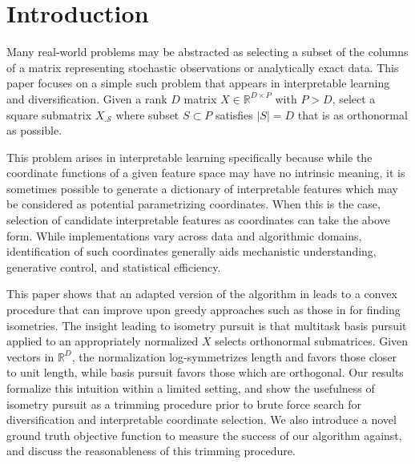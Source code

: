 \section{Introduction}
\label{sec:introduction}

Many real-world problems may be abstracted as selecting a subset of the columns of a matrix representing stochastic observations or analytically exact data.
This paper focuses on a simple such problem that appears in interpretable learning and diversification.
Given a rank $D$ matrix $ X \in \mathbb R^{D \times P}$ with $P > D$, select a square submatrix $ X_{.\mathcal S}$ where subset $ S \subset P$ satisfies $| S| = D$ that is as orthonormal as possible.

This problem arises in interpretable learning specifically because while the coordinate functions of a given feature space may have no intrinsic meaning, it is sometimes possible to generate a dictionary of interpretable features which may be considered as potential parametrizing coordinates.
When this is the case, selection of candidate interpretable features as coordinates can take the above form.
While implementations vary across data and algorithmic domains, identification of such coordinates generally aids mechanistic understanding, generative control, and statistical efficiency.

This paper shows that an adapted version of the algorithm in \citet{Koelle2024-no} leads to a convex procedure that can improve upon greedy approaches such as those in \citet{5895106, NEURIPS2019_6a10bbd4, Kohli2021-lr, Jones2007-uc} for finding isometries.
The insight leading to isometry pursuit is that multitask basis pursuit applied to an appropriately normalized $ X$ selects orthonormal submatrices.
Given vectors in $\mathbb R^D$, the normalization log-symmetrizes length and favors those closer to unit length, while basis pursuit favors those which are orthogonal.
Our results formalize this intuition within a limited setting, and show the usefulness of isometry pursuit as a trimming procedure prior to brute force search for diversification and interpretable coordinate selection.
We also introduce a novel ground truth objective function to measure the success of our algorithm against, and discuss the reasonableness of this trimming procedure.

